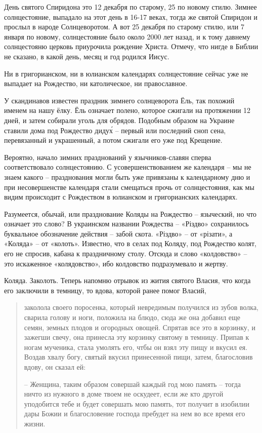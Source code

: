    День святого Спиридона это 12 декабря по старому, 25 по новому стилю. Зимнее солнцестояние, выпадало на этот день в 16-17 веках, тогда же святой Спиридон и прослыл в народе Солнцеворотом. А вот 25 декабря по старому стилю, или 7 января по новому, солнцестояние было около 2000 лет назад, и к тому давнему солнцестояню церковь приурочила рождение Христа. Отмечу, что нигде в Библии не сказано, в какой день, месяц и год родился Иисус.

   Ни в григорианском, ни в юлианском календарях солнцестояние сейчас уже не выпадает на Рождество, ни католическое, ни православное.

   У скандинавов известен праздник зимнего солнцеворота Ёль, так похожий именем на нашу ёлку. Ёль означает полено, которое сжигали на протяжении 12 дней, и затем собирали уголь для обрядов. Подобным образом на Украине ставили дома под Рождество диду\'х – первый или последний сноп сена, перевязанный и украшенный, а потом сжигали его уже под Крещение.

   Вероятно, начало зимних празднований у язычников-славян сперва соответствовало  солнцестоянию. С усовершенствованием же календаря – мы не знаем какого – празднования могли быть уже привязаны к календарному дню и при несовершенстве календаря стали смещаться прочь от солнцестояния, как мы видим происходит с Рождеством в юлианском и григорианских календарях.

   Разумеется, обычай, или празднование Коляды на Рождество – языческий, но что означает это слово? В украинском названии
Рождества – «Різдво» сохранилось буквальное обозначение действия – забой скота. «Різдво» – от «різати», а «Коляда» – от «колоть». Известно, что в селах под Коляду, под Рождество колят, его не спросив, кабана к праздничному столу. Отсюда и слово «колдовство» – это искаженное «колядовство», ибо колдовство подразумевало и жертву.

   Коляда. Заколоть. Теперь напомню отрывок из жития святого Власия, что когда его заключили в темницу, то вдова, которой ранее помог Власий,

\begin{quotation}
заколола своего поросенка, который невредимым получился из зубов волка, сварила голову и ноги, положила на блюдо, сюда же она добавил еще семян, земных плодов и огородных овощей. Спрятав все это в корзинку, и зажегши свечу, она принесла эту корзинку святому в темницу. Припав к ногам мученика, стала умолять его, чтбы он взял эту пищу и вкусил ея. Воздав хвалу богу, святый вкусил принесенной пищи, затем, благословив вдову, он сказал ей:

 – Женщина, таким образом совершай каждый год мою память – тогда ничто из нужного в доме твоем не оскудеет, если же кто другой уподобится тебе и будет совершать мою память, тот получит в изобилии дары Божии и благословение господа пребудет на нем во все время его жизни.
\end{quotation}

